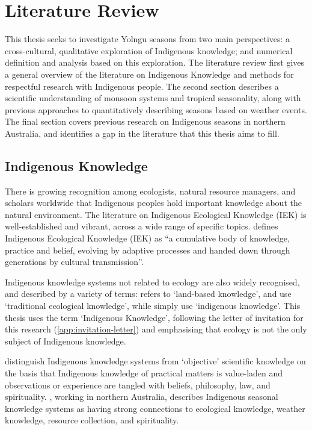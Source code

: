 \chapter{Literature Review}
\label{ch:lit-review}

This thesis seeks to investigate Yolngu seasons from two main perspectives:
a cross-cultural, qualitative exploration of Indigenous knowledge; and
numerical definition and analysis based on this exploration.
%
The literature review first gives a general
overview of the literature on Indigenous Knowledge and methods for respectful
research with Indigenous people.  The second section describes a scientific
understanding of monsoon systems and tropical seasonality, along with previous
approaches to quantitatively describing seasons based on weather events.
The final section covers previous research on Indigenous seasons in northern
Australia, and identifies a gap in the literature that this thesis aims to fill.


\section{Indigenous Knowledge}
\label{sec:lit-iek}

There is growing recognition among ecologists, natural resource managers, and
scholars worldwide that Indigenous peoples hold important knowledge about the
natural environment.  The literature on Indigenous Ecological Knowledge (IEK)
is well-established and vibrant, across a wide range of specific topics.
\citet{berkes2012} defines Indigenous Ecological Knowledge (IEK) as ``a cumulative
body of knowledge, practice and belief, evolving by adaptive processes and
handed down through generations by cultural transmission''.

Indigenous knowledge systems not related to ecology are also widely recognised,
and described by a variety of terms:  \citet{clarke2009} refers to `land-based
knowledge', \citet{petheram2010} and \citet{turner2009} use `traditional
ecological knowledge', while \citet{cochran2015} simply use `indigenous
knowledge'.  This thesis uses the term `Indigenous Knowledge', following the
letter of invitation for this research (\cref{app:invitation-letter}) and
emphasising that ecology is not the only subject of Indigenous knowledge.


\citet{turner2009} distinguish Indigenous knowledge systems from `objective'
scientific knowledge on the basis that Indigenous knowledge of practical
matters is value-laden and observations or experience are tangled with beliefs,
philosophy, law, and spirituality.  \citet{woodward2012b}, working in northern
Australia, describes Indigenous seasonal knowledge systems as having strong connections
to ecological knowledge, weather knowledge, resource collection, and spirituality.


